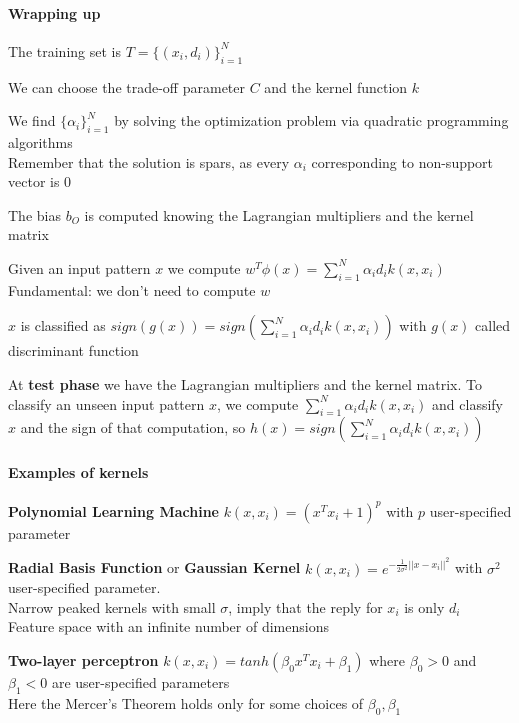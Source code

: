 \documentclass[10pt]{report}
\begin{document}
\paragraph{Wrapping up}
\begin{list}{}{}
	\item The training set is $T = \{(x_i,d_i)\}_{i=1}^N$
	\item We can choose the trade-off parameter $C$ and the kernel function $k$
	\item We find $\{\alpha_i\}_{i=1}^N$ by solving the optimization problem via quadratic programming algorithms\\
	Remember that the solution is spars, as every $\alpha_i$ corresponding to non-support vector is $0$
	\item The bias $b_O$ is computed knowing the Lagrangian multipliers and the kernel matrix
	\item Given an input pattern $x$ we compute $w^T\phi(x) = \sum_{i=1}^N\alpha_id_ik(x,x_i)$\\
	Fundamental: we don't need to compute $w$
	\item $x$ is classified as $sign(g(x)) = sign\left(\sum_{i=1}^N\alpha_id_ik(x,x_i)\right)$ with $g(x)$ called discriminant function
\end{list}
At \textbf{test phase} we have the Lagrangian multipliers and the kernel matrix. To classify an unseen input pattern $x$, we compute $\sum_{i=1}^N\alpha_id_ik(x,x_i)$ and classify $x$ and the sign of that computation, so $h(x) = sign\left(\sum_{i=1}^N\alpha_id_ik(x,x_i)\right)$
\paragraph{Examples of kernels}
\begin{list}{}{}
	\item \textbf{Polynomial Learning Machine} $k(x,x_i) = (x^Tx_i + 1)^p$ with $p$ user-specified parameter
	\item \textbf{Radial Basis Function} or \textbf{Gaussian Kernel} $k(x,x_i) = e^{-\frac{1}{2\sigma^2}||x-x_i||^2}$ with $\sigma^2$ user-specified parameter.\\
	Narrow peaked kernels with small $\sigma$, imply that the reply for $x_i$ is only $d_i$\\
	Feature space with an infinite number of dimensions
	\item \textbf{Two-layer perceptron} $k(x,x_i) = tanh(\beta_0x^Tx_i + \beta_1)$ where $\beta_0 > 0$ and $\beta_1 < 0$ are user-specified parameters\\
	Here the Mercer's Theorem holds only for some choices of $\beta_0,\beta_1$
\end{list}
\end{document}

